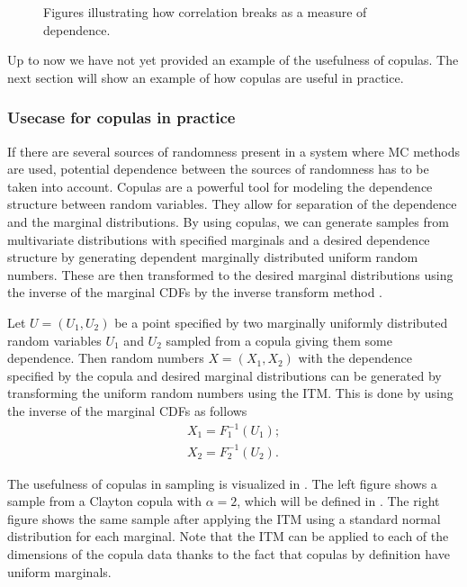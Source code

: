 \begin{figure}
\begin{minipage}{0.45\textwidth}
        \label{fig:exponentialDependenceScatterRet}
    \end{minipage}
    \caption{Figures illustrating how correlation breaks as a measure of dependence.}
    \label{fig:ExamplePlots}
\end{figure}

Up to now we have not yet provided an example of the usefulness of copulas. The next section will show an example of how copulas are useful in practice.

\subsubsection{Usecase for copulas in practice}\label{sec:CopulaUseCase}
If there are several sources of randomness present in a system where \gls{MC} methods are used, potential dependence between the sources of randomness has to be taken into account. Copulas are a powerful tool for modeling the dependence structure between random variables. They allow for separation of the dependence and the marginal distributions. By using copulas, we can generate samples from multivariate distributions with specified marginals and a desired dependence structure by generating dependent marginally distributed uniform random numbers. These are then transformed to the desired marginal distributions using the inverse of the marginal \gls{CDF}s by the inverse transform method .

Let $U = (U_1,U_2)$ be a point specified by two marginally uniformly distributed random variables $U_1$ and $U_2$ sampled from a copula giving them some dependence. Then random numbers $X = (X_1,X_2)$ with the dependence specified by the copula and desired marginal distributions can be generated by transforming the uniform random numbers using the \gls{ITM}. This is done by using the inverse of the marginal \gls{CDF}s as follows
\begin{align*}
    X_1 = F_1^{-1}(U_1); \\
    X_2 = F_2^{-1}(U_2).
\end{align*}

The usefulness of copulas in sampling is visualized in . The left figure shows a sample from a Clayton copula with $\alpha = 2$, which will be defined in . The right figure shows the same sample after applying the \gls{ITM} using a standard normal distribution for each marginal. Note that the \gls{ITM} can be applied to each of the dimensions of the copula data thanks to the fact that copulas by definition have uniform marginals. 

